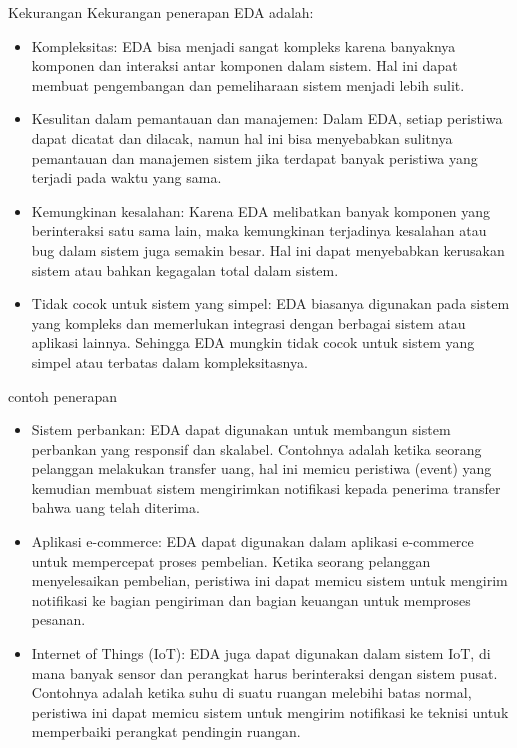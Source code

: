 \documentclass{beamer}
\begin{document}
	\begin{frame}{Kekurangan}
		Kekurangan penerapan EDA adalah:
		\begin{itemize}
		\item Kompleksitas: EDA bisa menjadi sangat kompleks karena banyaknya komponen dan interaksi antar komponen dalam sistem. Hal ini dapat membuat pengembangan dan pemeliharaan sistem menjadi lebih sulit.	
		\item Kesulitan dalam pemantauan dan manajemen: Dalam EDA, setiap peristiwa dapat dicatat dan dilacak, namun hal ini bisa menyebabkan sulitnya pemantauan dan manajemen sistem jika terdapat banyak peristiwa yang terjadi pada waktu yang sama.	
		\item Kemungkinan kesalahan: Karena EDA melibatkan banyak komponen yang berinteraksi satu sama lain, maka kemungkinan terjadinya kesalahan atau bug dalam sistem juga semakin besar. Hal ini dapat menyebabkan kerusakan sistem atau bahkan kegagalan total dalam sistem.
		\item Tidak cocok untuk sistem yang simpel: EDA biasanya digunakan pada sistem yang kompleks dan memerlukan integrasi dengan berbagai sistem atau aplikasi lainnya. Sehingga EDA mungkin tidak cocok untuk sistem yang simpel atau terbatas dalam kompleksitasnya.
		\end{itemize}
	\end{frame}
	
	\begin{frame}{contoh penerapan}
		\begin{itemize}
			\item Sistem perbankan: EDA dapat digunakan untuk membangun sistem perbankan yang responsif dan skalabel. Contohnya adalah ketika seorang pelanggan melakukan transfer uang, hal ini memicu peristiwa (event) yang kemudian membuat sistem mengirimkan notifikasi kepada penerima transfer bahwa uang telah diterima.
			\item Aplikasi e-commerce: EDA dapat digunakan dalam aplikasi e-commerce untuk mempercepat proses pembelian. Ketika seorang pelanggan menyelesaikan pembelian, peristiwa ini dapat memicu sistem untuk mengirim notifikasi ke bagian pengiriman dan bagian keuangan untuk memproses pesanan.
			\item Internet of Things (IoT): EDA juga dapat digunakan dalam sistem IoT, di mana banyak sensor dan perangkat harus berinteraksi dengan sistem pusat. Contohnya adalah ketika suhu di suatu ruangan melebihi batas normal, peristiwa ini dapat memicu sistem untuk mengirim notifikasi ke teknisi untuk memperbaiki perangkat pendingin ruangan.
		\end{itemize}
	\end{frame}
	
\end{document}
